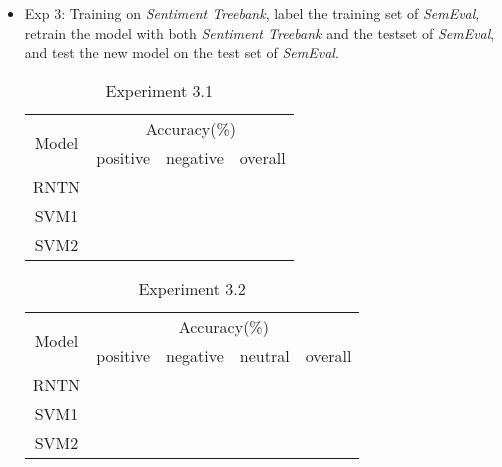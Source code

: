 \begin{itemize}
\item Exp 3: Training on \textit{Sentiment Treebank}, label the training set of \textit{SemEval}, retrain the model with both \textit{Sentiment Treebank} and the testset of \textit{SemEval}, and test the new model on the test set of \textit{SemEval}. 

\begin{table}[H]
  \begin{center}
    \begin{tabular}{cccc}\hline
      \multirow{2}{*}{Model} 
      & \multicolumn{3}{c}{Accuracy(\%)} \\\cline{2-4}
    & positive & negative & overall \\ \hline
    RNTN  &          &     	   &      \\ 
    SVM1  & ~        &          &         \\ 
    SVM2  & ~        &          &         \\ \hline
    \end{tabular}
    \end{center}
    \caption{\label{exp5_3_1} Experiment 3.1}
\end{table}


\begin{table}[H]
  \begin{center}
    \begin{tabular}{ccccc}\hline
      \multirow{2}{*}{Model} 
      & \multicolumn{4}{c}{Accuracy(\%)} \\\cline{2-5}
    & positive & negative & neutral & overall \\ \hline
    RNTN  & ~        &   ~	   &   ~          &    \\ 
    SVM1  & ~        &          &             &   \\ 
    SVM2  & ~        &          &             & \\ \hline
    \end{tabular}
    \end{center}
    \caption{\label{exp5_3_2} Experiment 3.2}
\end{table}

\end{itemize}







